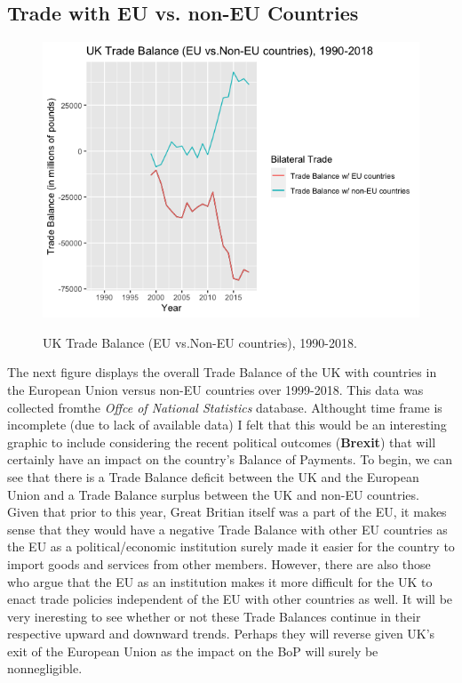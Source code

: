 \documentclass[12pt]{article}
\begin{document}
\newpage

\subsection{Trade with EU vs. non-EU Countries}

\begin{figure}[h!]
\begin{center}
\includegraphics[scale=0.75]{4.png}
\label{}
\caption{UK Trade Balance (EU vs.Non-EU countries), 1990-2018.}
\end{center}
\end{figure}

\begin{flushleft}
The next figure displays the overall Trade Balance of the UK with countries in the European Union versus non-EU countries over 1999-2018. This data was collected fromthe  \textit{Offce of National Statistics} database. Althought time frame is incomplete (due to lack of available data) I felt that this would be an interesting graphic to include considering the recent political outcomes (\textbf{Brexit}) that will certainly have an impact on the country's  Balance of Payments.
\break
\linebreak
To begin, we can see that there is a Trade Balance deficit between the UK and the European Union and a Trade Balance surplus between the UK and non-EU countries. Given that prior to this year, Great Britian itself was a part of the EU, it makes sense that they would have a negative Trade Balance with other EU countries as the EU as a political/economic institution surely made it easier for the country to import goods and services from other members. However, there are also those who argue that the EU as an institution makes it more difficult for the UK to enact trade policies independent of the EU with other countries as well.
\break
\linebreak
It will be very ineresting to see whether or not these Trade Balances continue in their respective upward and downward trends. Perhaps they will reverse given UK's exit of the European Union as the impact on the BoP will surely be nonnegligible. 


\end{flushleft}
\end{document}
